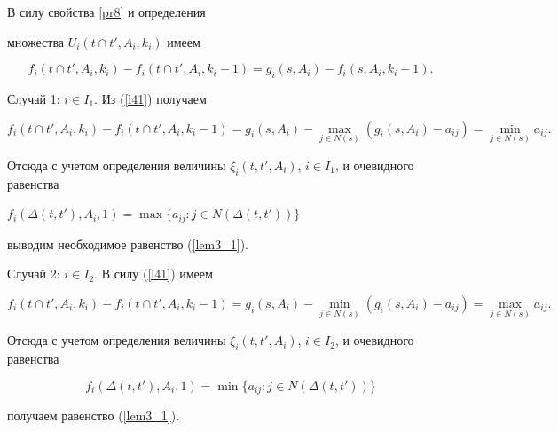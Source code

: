 \begin{pf}


В силу свойства \ref{pr8} и определения


множества $U_i(t\cap t', A_i, k_i)$ имеем


\begin{equation}\label{l41}


f_i(t\cap t', A_i, k_i)-f_i(t\cap t', A_i, k_i-1)=g_i(s,


A_i)-f_i(s, A_i, k_i-1).


\end{equation}





Случай 1: $i\in I_1$. Из (\ref{l41}) получаем


$$


f_i(t\cap t', A_i, k_i)-f_i(t\cap t', A_i, k_i-1)=g_i(s,


A_i)-\max_{j\in N(s)}{(g_i(s, A_i)-a_{ij})}=\min_{j\in


N(s)}{a_{ij}}.


$$


Отсюда с учетом определения величины $\xi_i(t, t', A_i)$, $i\in


I_1$, и очевидного равенства


$f_i(\Delta(t, t'), A_i, 1)=\max\{a_{ij}: j\in N(\Delta(t,


t'))\}$


выводим необходимое равенство (\ref{lem3_1}).





Случай 2: $i\in I_2$. В силу (\ref{l41}) имеем


$$


f_i(t\cap t', A_i, k_i)-f_i(t\cap t', A_i, k_i-1)=g_i(s,


A_i)-\min_{j\in N(s)}{(g_i(s, A_i)-a_{ij})}=\max_{j\in


N(s)}{a_{ij}}.


$$


Отсюда с учетом определения величины $\xi_i(t, t', A_i)$, $i\in


I_2$, и очевидного равенства


$$


f_i(\Delta(t, t'), A_i, 1)=\min\{a_{ij}: j\in N(\Delta(t,


t'))\}


$$


получаем равенство (\ref{lem3_1}).


\end{pf}





